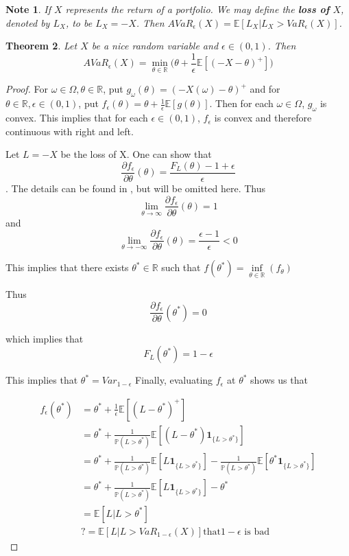 \documentclass[12pt]{amsart}
\newtheorem{thm}{Theorem}[section]
\newtheorem{note}[thm]{Note}
\newcommand{\ep}{\epsilon}
\newcommand{\om}{\omega}
\newcommand{\Om}{\Omega}
\newcommand{\E}{\mathbb{E}}
\newcommand{\R}{\mathbb{R}}
\renewcommand{\P}{\mathbb{P}}
\begin{document}
\begin{note}
If $X$ represents the return of a portfolio. We may define the \textbf{loss of} $X$, denoted by $L_X$, to be $L_X = -X$. Then $AVaR_{\ep}(X) = \E[L_X|L_X>VaR_{\ep}(X)]$.  
\end{note}

\begin{thm}
Let $X$ be a nice random variable and $\ep \in (0,1)$. Then $$AVaR_{\ep}(X) = \min_{\theta \in \R} \bigg(\theta + \frac{1}{\ep}\E[(-X - \theta)^+]\bigg)$$
\end{thm}

\begin{proof} 
For $\om \in \Om, \theta \in \R$, put $g_{\om}(\theta) = (-X(\om) - \theta)^+$ and for $\theta \in \R, \ep \in (0,1)$, put $f_{\ep}(\theta) = \theta + \frac{1}{\ep}\E[g(\theta)]$. Then for each $\om \in \Om$, $g_{\om}$ is convex. This implies that for each $\ep \in (0,1)$, $f_{\ep}$ is convex and therefore continuous with right and left.

Let $L = -X$ be the loss of X.  One can show that $$\frac{\partial f_{\ep}}{\partial \theta}(\theta) = \frac{F_L(\theta) -1 + \ep}{\ep} $$. The details can be found in \cite{Rockafellar and Uryasev (2002)}, but will be omitted here. Thus $$\lim_{\theta \rightarrow \infty}\frac{\partial f_{\ep}}{\partial \theta}(\theta) = 1$$ and $$\lim_{\theta \rightarrow -\infty} \frac{\partial f_{\ep}}{\partial \theta}(\theta) = \frac{\ep-1}{\ep} <0$$

This implies that there exists $\theta^* \in \R$ such that $f(\theta^*) = \inf\limits_{\theta \in \R}(f_{\theta})$

Thus $$\frac{\partial f_{\ep}}{\partial \theta}(\theta^*) = 0$$

which implies that $$F_L(\theta^*) = 1-\ep$$

This implies that $\theta^* = Var_{1-\ep}$ Finally, evaluating $f_{\ep}$ at $\theta^*$ shows us that 

\begin{align*}
f_{\ep}(\theta^*)  
&=  \theta^* + \frac{1}{\epsilon}\E[(L - \theta^*)^+]\\
& = \theta^* + \frac{1}{\P(L>\theta^*)}\E[(L-\theta^*)\mathbf{1}_{\{L>\theta^*\}}] \\
& = \theta^* + \frac{1}{\P(L>\theta^*)}\E[L\mathbf{1}_{\{L>\theta^*\}}] - \frac{1}{\P(L>\theta^*)}\E[\theta^*\mathbf{1}_{\{L>\theta^*\}}] \\
& = \theta^* + \frac{1}{\P(L>\theta^*)}\E[L\mathbf{1}_{\{L>\theta^*\}}] - \theta^* \\
&= \E[L|L> \theta^*] \\
& ?= \E[L|L>VaR_{1-\ep}(X)] \text{that} 1-\ep \text{ is bad}
\end{align*}

\end{proof}
\end{document}
